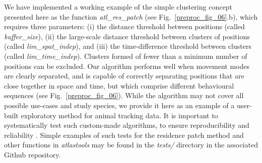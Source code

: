 We have implemented a working example of the simple clustering concept presented here as the function \textit{atl\_res\_patch} (see Fig.~\ref{preproc_fig_06}.b), which requires three parameters: (i) the distance threshold between positions (called \textit{buffer\_size}), (ii) the large-scale distance threshold between clusters of positions (called \textit{lim\_spat\_indep}), and (iii) the time-difference threshold between clusters (called \textit{lim\_time\_indep}).
Clusters formed of fewer than a minimum number of positions can be excluded.
Our algorithm performs well when movement modes are clearly separated, and is capable of correctly separating positions that are close together in space and time, but which comprise different behavioural sequences (see Fig.~\ref{preproc_fig_06}).
While the algorithm may not cover all possible use-cases and study species, we provide it here as an example of a user-built exploratory method for animal tracking data.
It is important to systematically test such custom-made algorithms, to ensure reproducibility and reliability \citep{wickham2015, marwick2018}.
Simple examples of such tests for the residence patch method and other functions in \textit{atlastools} may be found in the \textit{tests/} directory in the associated Github repository.



